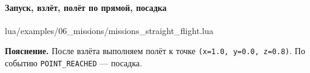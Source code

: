 \paragraph{Запуск, взлёт, полёт по прямой, посадка}
\begin{codefile}{lua/examples/06_missions/missions_straight_flight.lua}
\end{codefile}
\textbf{Пояснение.} После взлёта выполняем полёт к точке \texttt{(x=1.0, y=0.0, z=0.8)}. По событию \texttt{POINT\_REACHED} — посадка.

